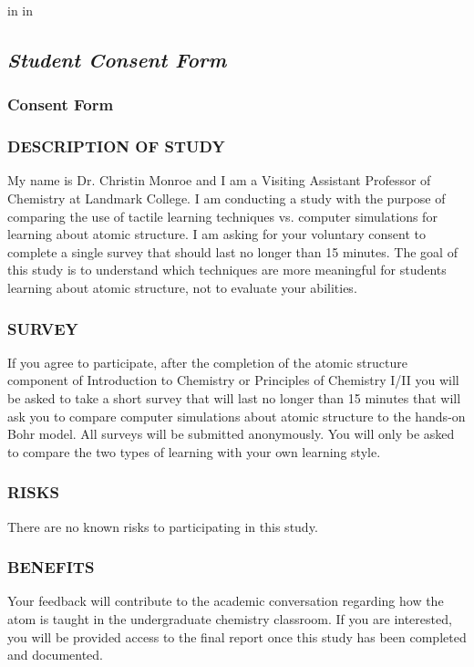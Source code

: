 \documentclass[11pt]{sig-alternate}
\begin{document}
\begin{large}
\clearpage

\onecolumn
{} in
 in 

\subsection*{\textit{Student Consent Form}}
\subsubsection*{Consent Form}

\subsubsection*{\textbf{DESCRIPTION OF STUDY}}
My name is Dr. Christin Monroe and I am a Visiting Assistant Professor of Chemistry at Landmark College. I am conducting a study with the purpose of comparing the use of tactile learning techniques vs. computer simulations for learning about atomic structure. I am asking for your voluntary consent to complete a single survey that should last no longer than 15 minutes. The goal of this study is to understand which techniques are more meaningful for students learning about atomic structure, not to evaluate your abilities.

\subsubsection*{\textbf{SURVEY}}
If you agree to participate, after the completion of the atomic structure component of Introduction to Chemistry or Principles of Chemistry I/II you will be asked to take a short survey that will last no longer than 15 minutes that will ask you to compare computer simulations about atomic structure to the hands-on Bohr model. All surveys will be submitted anonymously. You will only be asked to compare the two types of learning with your own learning style.

\subsubsection*{\textbf{RISKS}}
There are no known risks to participating in this study.

\subsubsection*{\textbf{BENEFITS}}
Your feedback will contribute to the academic conversation regarding how the atom is taught in the undergraduate chemistry classroom. If you are interested, you will be provided access to the final report once this study has been completed and documented. 


\end{large}
\end{document}
